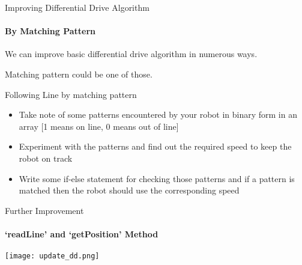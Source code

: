 \documentclass{beamer}
\begin{document}
	\begin{frame}{Improving Differential Drive Algorithm}
	
		\framesubtitle{By Matching Pattern}
		
		We can improve basic differential drive algorithm in numerous ways.
		
		\bigskip
		
		Matching pattern could be one of those. 
		
		\begin{alertblock}{Following Line by matching pattern}
		
		\begin{itemize}
			
			\item{Take note of some patterns encountered by your robot in binary form in an array [1 means on line, 0 means out of line]}
			
			\item{Experiment with the patterns and find out the required speed to keep the robot on track}
			
			\item{Write some if-else statement for checking those patterns and if a pattern is matched then the robot should use the corresponding speed}
		
		\end{itemize}
		
		\end{alertblock}	
	
	\end{frame}
	
	\begin{frame}{Further Improvement}
	
		\framesubtitle{`readLine' and `getPosition' Method}
		
		\texttt{[image: update\_dd.png]}
		
		
	
	\end{frame}
	
\end{document}
